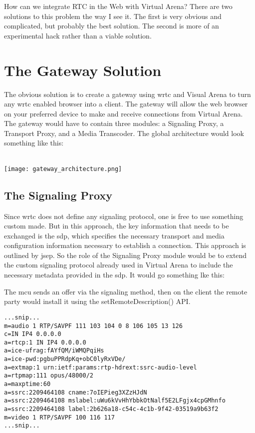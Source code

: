 
How can we integrate RTC in the Web with Virtual Arena?
There are two solutions to this problem the way I see it. The first is very obvious and complicated, but probably the best solution. The second is more of an experimental hack rather than a viable solution.

\section{The Gateway Solution}
The obvious solution is to create a gateway using \gls{wrtc} and Visual Arena to turn any \gls{wrtc} enabled browser into a client. The gateway will allow the web browser on your preferred device to make and receive connections from Virtual Arena. The gateway would have to contain three modules:
a Signaling Proxy, a Transport Proxy, and a Media Transcoder. The global architecture would look something like this:
\\
\\
\centerline{\texttt{[image: gateway\_architecture.png]}}

\subsection{The Signaling Proxy}
Since \gls{wrtc} does not define any signaling protocol, one is free to use something custom made. But in this approach, the key information that needs to be exchanged is the \gls{sdp}, which specifies the necessary transport and media configuration information necessary to establish a connection. This approach is outlined by \gls{jsep}. So the role of the Signaling Proxy module would be to extend the custom signaling protocol already used in Virtual Arena to include the necessary metadata provided in the \gls{sdp}. It would go something lke this:

The \gls{mcu} sends an offer via the signaling method, then on the client the remote party would install it using the setRemoteDescription() API.

\begin{lstlisting}
...snip...
m=audio 1 RTP/SAVPF 111 103 104 0 8 106 105 13 126
c=IN IP4 0.0.0.0
a=rtcp:1 IN IP4 0.0.0.0
a=ice-ufrag:fAYfQM/iWMQPqiHs
a=ice-pwd:pgbuPPRdpKq+obC0lyRxVDe/
a=extmap:1 urn:ietf:params:rtp-hdrext:ssrc-audio-level
a=rtpmap:111 opus/48000/2
a=maxptime:60
a=ssrc:2209464108 cname:7oIEPieg3XZzHJdN
a=ssrc:2209464108 mslabel:uWu6kVvHhYbbkOtNalf5E2LFgjx4cpGMhnfo
a=ssrc:2209464108 label:2b626a18-c54c-4c1b-9f42-03519a9b63f2
m=video 1 RTP/SAVPF 100 116 117
...snip...
\end{lstlisting}

